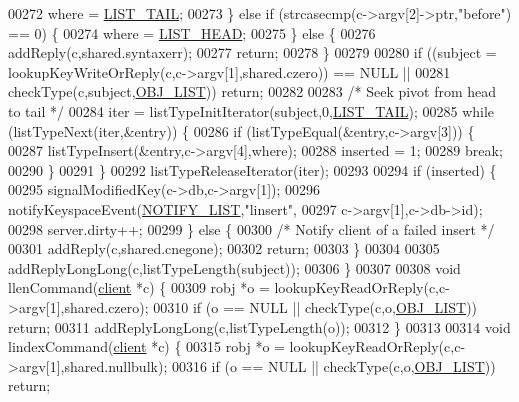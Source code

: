 \begin{DoxyCode}
00272         where = \hyperlink{server_8h_a745de98bef5b645df56479181803235b}{LIST\_TAIL};
00273     \} \textcolor{keywordflow}{else} \textcolor{keywordflow}{if} (strcasecmp(c->argv[2]->ptr,\textcolor{stringliteral}{"before"}) == 0) \{
00274         where = \hyperlink{server_8h_a5fc6a15ca26c6208f66ad2768a3108ef}{LIST\_HEAD};
00275     \} \textcolor{keywordflow}{else} \{
00276         addReply(c,shared.syntaxerr);
00277         \textcolor{keywordflow}{return};
00278     \}
00279 
00280     \textcolor{keywordflow}{if} ((subject = lookupKeyWriteOrReply(c,c->argv[1],shared.czero)) == NULL ||
00281         checkType(c,subject,\hyperlink{server_8h_a4a5f22a280949c97a0cb0d4213275126}{OBJ\_LIST})) \textcolor{keywordflow}{return};
00282 
00283     \textcolor{comment}{/* Seek pivot from head to tail */}
00284     iter = listTypeInitIterator(subject,0,\hyperlink{server_8h_a745de98bef5b645df56479181803235b}{LIST\_TAIL});
00285     \textcolor{keywordflow}{while} (listTypeNext(iter,&entry)) \{
00286         \textcolor{keywordflow}{if} (listTypeEqual(&entry,c->argv[3])) \{
00287             listTypeInsert(&entry,c->argv[4],where);
00288             inserted = 1;
00289             \textcolor{keywordflow}{break};
00290         \}
00291     \}
00292     listTypeReleaseIterator(iter);
00293 
00294     \textcolor{keywordflow}{if} (inserted) \{
00295         signalModifiedKey(c->db,c->argv[1]);
00296         notifyKeyspaceEvent(\hyperlink{server_8h_a1c0b64c84b0e66dff3554ffe3e2ec4c8}{NOTIFY\_LIST},\textcolor{stringliteral}{"linsert"},
00297                             c->argv[1],c->db->id);
00298         server.dirty++;
00299     \} \textcolor{keywordflow}{else} \{
00300         \textcolor{comment}{/* Notify client of a failed insert */}
00301         addReply(c,shared.cnegone);
00302         \textcolor{keywordflow}{return};
00303     \}
00304 
00305     addReplyLongLong(c,listTypeLength(subject));
00306 \}
00307 
00308 \textcolor{keywordtype}{void} llenCommand(\hyperlink{structclient}{client} *c) \{
00309     robj *o = lookupKeyReadOrReply(c,c->argv[1],shared.czero);
00310     \textcolor{keywordflow}{if} (o == NULL || checkType(c,o,\hyperlink{server_8h_a4a5f22a280949c97a0cb0d4213275126}{OBJ\_LIST})) \textcolor{keywordflow}{return};
00311     addReplyLongLong(c,listTypeLength(o));
00312 \}
00313 
00314 \textcolor{keywordtype}{void} lindexCommand(\hyperlink{structclient}{client} *c) \{
00315     robj *o = lookupKeyReadOrReply(c,c->argv[1],shared.nullbulk);
00316     \textcolor{keywordflow}{if} (o == NULL || checkType(c,o,\hyperlink{server_8h_a4a5f22a280949c97a0cb0d4213275126}{OBJ\_LIST})) \textcolor{keywordflow}{return};

\end{DoxyCode}
